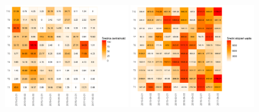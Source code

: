 \documentclass[]{beamer}
\newcommand{\sizequad}{0.40}
\begin{document}
\begin{frame}
\begin{minipage}{\textwidth}
            \includegraphics[width=\sizequad\textwidth]{pictures/srednia_centralnosc/srednia_centralnosc_hm.png}\quad
			\includegraphics[width=\sizequad\textwidth]{pictures/sredni_stopien_wezla/sredni_stopien_wezla_hm.png}
 \end{minipage} 
 
\end{frame}
\end{document}
